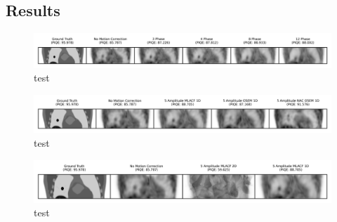         \subsection{Results} \label{sec:test_results}
            \begin{figure}
                \centering
                
                \includegraphics[width=1.0\linewidth]{figures/motion_correction_2_results_2_phase_visual_analysis.png}
                
                \captionsetup{singlelinecheck=false}
                \caption{
                    test
                }
                
                \label{fig:test_phase_visual_analysis}
            \end{figure}

            \begin{figure}
                \centering
                
                \includegraphics[width=1.0\linewidth]{figures/motion_correction_2_results_2_5_amplitude_visual_analysis.png}
                
                \captionsetup{singlelinecheck=false}
                \caption{
                    test
                }
                
                \label{fig:test_5_amplitude_visual_analysis}
            \end{figure}

            \begin{figure}
                \centering
                
                \includegraphics[width=1.0\linewidth]{figures/motion_correction_2_results_2_1d_vs_2d_visual_analysis.png}
                
                \captionsetup{singlelinecheck=false}
                \caption{
                    test
                }
                
                \label{fig:test_1d_vs_2d_visual_analysis}
            \end{figure}

